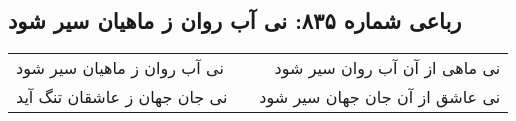 \begin{center}
\section*{رباعی شماره ۸۳۵: نی آب روان ز ماهیان سیر شود}
\label{sec:0835}
\begin{longtable}{l p{0.5cm} r}
نی آب روان ز ماهیان سیر شود
&&
نی ماهی از آن آب روان سیر شود
\\
نی جان جهان ز عاشقان تنگ آید
&&
نی عاشق از آن جان جهان سیر شود
\\
\end{longtable}
\end{center}
